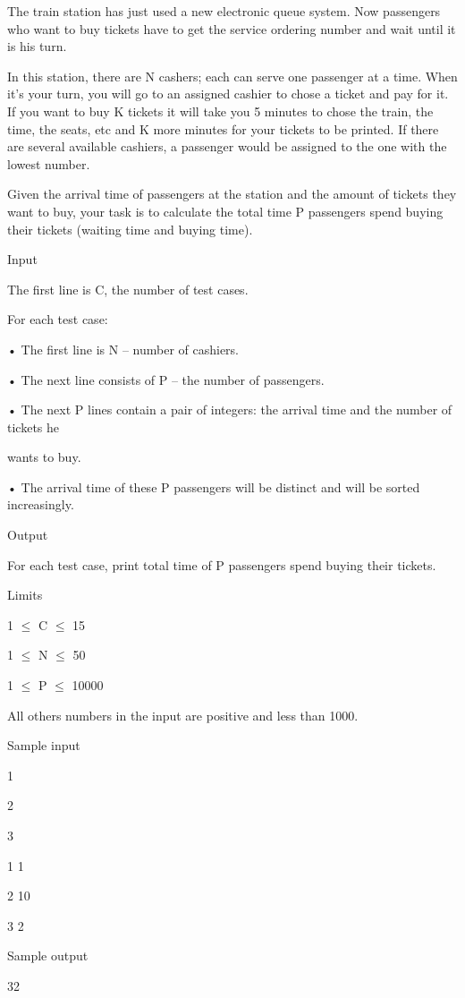 



   The train station has just used a new electronic queue system. Now passengers who want to buy tickets have to get the service ordering number and wait until it is his turn.  




   In this station, there are N cashers; each can serve one passenger at a time. When it’s your turn, you will go to an assigned cashier to chose a ticket and pay for it. If you want to buy K tickets it will take you 5 minutes to chose the train, the time, the seats, etc and K more minutes for your tickets to be printed. If there are several available cashiers, a passenger would be assigned to the one with the lowest number.  




   Given the arrival time of passengers at the station and the amount of tickets they want to buy, your task is to calculate the total time P passengers spend buying their tickets (waiting time and buying time).  




   Input   


   The first line is C, the number of test cases.   


   For each test case:   


   • The first line is N – number of cashiers.   


   • The next line consists of P – the number of passengers.   


   • The next P lines contain a pair of integers: the arrival time and the number of tickets he   


   wants to buy.   


   • The arrival time of these P passengers will be distinct and will be sorted increasingly.  




   Output   


   For each test case, print total time of P passengers spend buying their tickets.  




   Limits   


   1  $\le$  C  $\le$  15   


   1  $\le$  N  $\le$  50   


   1  $\le$  P  $\le$  10000   


   All others numbers in the input are positive and less than 1000.  




   Sample input   


   1   


   2   


   3   


   1 1   


   2 10   


   3 2  




   Sample output   


   32  
